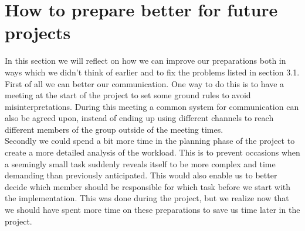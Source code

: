 \section{How to prepare better for future projects}
In this section we will reflect on how we can improve our preparations both in ways which we didn't think of earlier and to fix the problems listed in section 3.1.
First of all we can better our communication. One way to do this is to have a meeting at the start of the project to set some ground rules to avoid misinterpretations. During this meeting a common system for communication can also be agreed upon, instead of ending up using different channels to reach different members of the group outside of the meeting times. \\
Secondly we could spend a bit more time in the planning phase of the project to create a more detailed analysis of the workload.  This is to prevent occasions when a seemingly small task suddenly reveals itself to be more complex and time demanding than previously anticipated. This would also enable us to better decide which member should be responsible for which task before we start with the implementation. This was done during the project, but we realize now that we should  have spent more time on these preparations to save us time later in the project. \\
